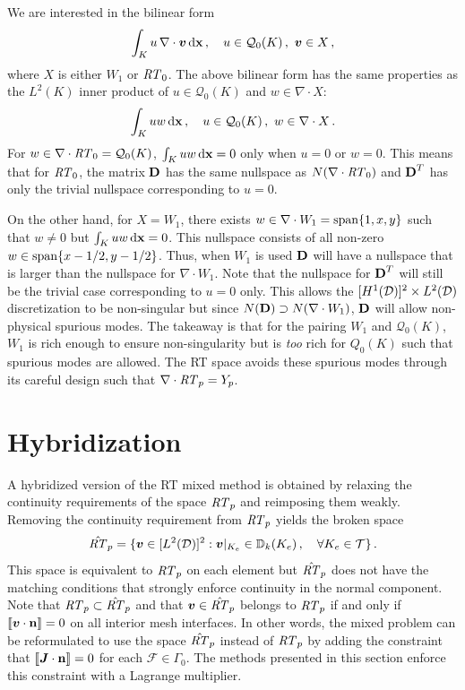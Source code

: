 \documentclass[../doc.tex]{subfiles}
\begin{document}
We are interested in the bilinear form 
	\begin{equation}
		\int_K u\, \nabla\cdot\boldsymbol{v} \mathop{}\!\mathrm{d} \boldsymbol{\mathrm{x}} \,, \quad u \in \mathcal{Q}_0(K)\,,\ \boldsymbol{v} \in X \,, 
	\end{equation}
where $X$ is either $W_1$ or $\mathit{RT}_0$. 
The above bilinear form has the same properties as the $L^2(K)$ inner product of $u \in \mathcal{Q}_0(K)$ and $w \in \nabla\cdot X$:
	\begin{equation}
		\int_K uw \mathop{}\!\mathrm{d} \boldsymbol{\mathrm{x}} \,, \quad u \in \mathcal{Q}_0(K) \,,\ w \in \nabla\cdot X \,. 
	\end{equation}
For $w\in \nabla\cdot\mathit{RT}_0 = \mathcal{Q}_0(K)$, $\int_K uw \mathop{}\!\mathrm{d} \boldsymbol{\mathrm{x}} = 0$ only when $u = 0$ or $w=0$. This means that for $\mathit{RT}_0$, the matrix $\boldsymbol{\mathrm{D}}$ has the same nullspace as $N(\nabla\cdot\mathit{RT}_0)$ and $\boldsymbol{\mathrm{D}}^T$ has only the trivial nullspace corresponding to $u=0$. 

On the other hand, for $X=W_1$, there exists $w \in \nabla\cdot W_1 = \operatorname{span}\{1,x,y\}$ such that $w \neq 0$ but $\int_K uw \mathop{}\!\mathrm{d} \boldsymbol{\mathrm{x}} = 0$. This nullspace consists of all non-zero $w \in \operatorname{span}\{x-1/2,y-1/2\}$. Thus, when $W_1$ is used $\boldsymbol{\mathrm{D}}$ will have a nullspace that is larger than the nullspace for $\nabla\cdot W_1$. Note that the nullspace for $\boldsymbol{\mathrm{D}}^T$ will still be the trivial case corresponding to $u=0$ only. This allows the $[H^1(\mathcal{D})]^2\times L^2(\mathcal{D})$ discretization to be non-singular but since $N(\boldsymbol{\mathrm{D}}) \supset N(\nabla\cdot W_1)$, $\boldsymbol{\mathrm{D}}$ will allow non-physical spurious modes. 
The takeaway is that for the pairing $W_1$ and $\mathcal{Q}_0(K)$, $W_1$ is rich enough to ensure non-singularity but is \emph{too} rich for $Q_0(K)$ such that spurious modes are allowed. 
The RT space avoids these spurious modes through its careful design such that $\nabla\cdot\mathit{RT}_p = Y_p$. 

\section{Hybridization} \label{rtvef_sec:hyb}
A hybridized version of the RT mixed method is obtained by relaxing the continuity requirements of the space $\mathit{RT}_p$ and reimposing them weakly. Removing the continuity requirement from $\mathit{RT}_p$ yields the broken space 
	\begin{equation}
		\hat{\mathit{RT}}_p = \{ \boldsymbol{v} \in [L^2(\mathcal{D})]^2 : \boldsymbol{v}|_{K_e} \in \mathbb{D}_k(K_e) \,, \quad \forall K_e \in \mathcal{T} \} \,. 
	\end{equation}
This space is equivalent to $\mathit{RT}_p$ on each element but $\hat{\mathit{RT}}_p$ does not have the matching conditions that strongly enforce continuity in the normal component. Note that $\mathit{RT}_p \subset \hat{\mathit{RT}}_p$ and that $\boldsymbol{v} \in \hat{\mathit{RT}}_p$ belongs to $\mathit{RT}_p$ if and only if $\left\llbracket\boldsymbol{v}\cdot\boldsymbol{\mathrm{n}} \right\rrbracket = 0$ on all interior mesh interfaces. In other words, the mixed problem can be reformulated to use the space $\hat{\mathit{RT}}_p$ instead of $\mathit{RT}_p$ by adding the constraint that $\left\llbracket\boldsymbol{J}\cdot\boldsymbol{\mathrm{n}} \right\rrbracket = 0$ for each $\mathcal{F} \in \Gamma_0$. The methods presented in this section enforce this constraint with a Lagrange multiplier. 
\end{document}
